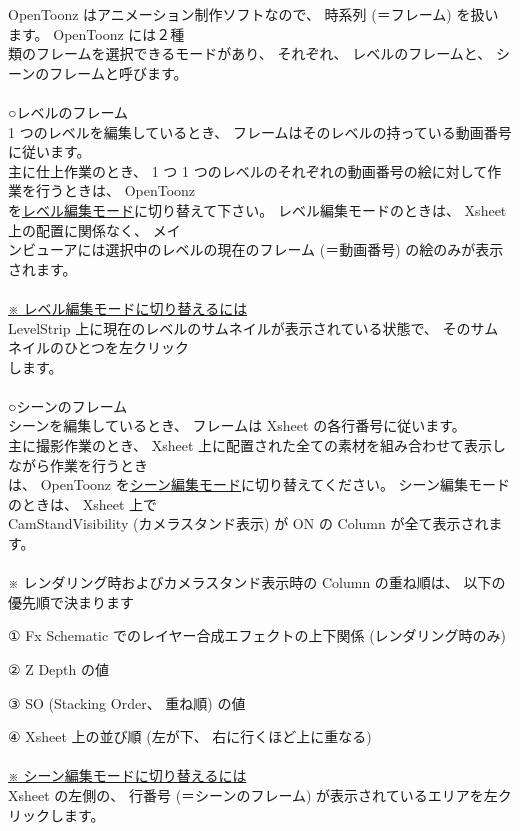 \documentclass[a4paper,10pt]{article}
\begin{document}
\normalsize
\noindent OpenToonz はアニメーション制作ソフトなので、 時系列 (＝フレーム) を扱います。 OpenToonz には２種\\
類のフレームを選択できるモードがあり、 それぞれ、 レベルのフレームと、 シーンのフレームと呼びます。\\
\\
\large
○レベルのフレーム\\
\normalsize
1 つのレベルを編集しているとき、 フレームはそのレベルの持っている動画番号に従います。\\
主に仕上作業のとき、 1 つ 1 つのレベルのそれぞれの動画番号の絵に対して作業を行うときは、 OpenToonz\\
を\uline{レベル編集モード}に切り替えて下さい。 レベル編集モードのときは、 Xsheet 上の配置に関係なく、 メイ\\
ンビューアには選択中のレベルの現在のフレーム (＝動画番号) の絵のみが表示されます。\\
\\
\uline{※ レベル編集モードに切り替えるには}\\
LevelStrip 上に現在のレベルのサムネイルが表示されている状態で、 そのサムネイルのひとつを左クリック\\
します。\\[0.5em]
\\
\large
○シーンのフレーム\\
\normalsize
シーンを編集しているとき、 フレームは Xsheet の各行番号に従います。\\
主に撮影作業のとき、 Xsheet 上に配置された全ての素材を組み合わせて表示しながら作業を行うとき\\
は、 OpenToonz を\uline{シーン編集モード}に切り替えてください。 シーン編集モードのときは、 Xsheet 上で\\
CamStandVisibility (カメラスタンド表示) が ON の Column が全て表示されます。\\
\\
※ レンダリング時およびカメラスタンド表示時の Column の重ね順は、 以下の優先順で決まります\par
① Fx Schematic でのレイヤー合成エフェクトの上下関係 (レンダリング時のみ)\par
② Z Depth の値\par
③ SO (Stacking Order、 重ね順) の値\par
④ Xsheet 上の並び順 (左が下、 右に行くほど上に重なる)\\
\\
\uline{※ シーン編集モードに切り替えるには}\\
Xsheet の左側の、 行番号 (＝シーンのフレーム) が表示されているエリアを左クリックします。
\end{document}
